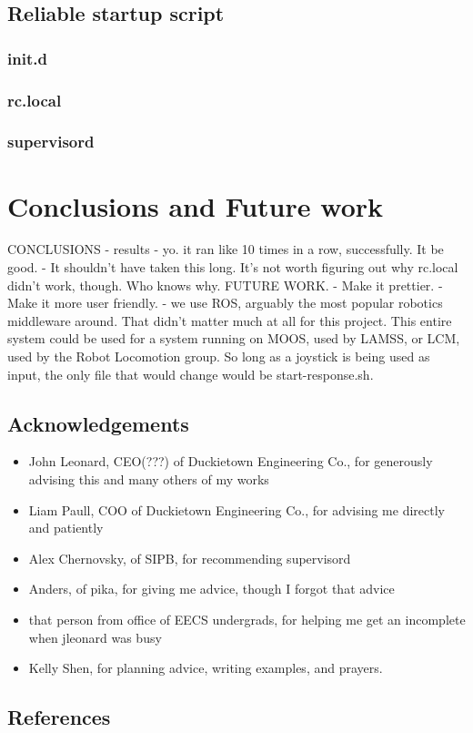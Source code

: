 \documentclass{article}
\begin{document}
\subsection{Reliable startup script} %
\subsubsection{init.d}
\subsubsection{rc.local}
\subsubsection{supervisord}
\section{Conclusions and Future work}
CONCLUSIONS
- results
- yo. it ran like 10 times in a row, successfully. It be good.
- It shouldn't have taken this long. It's not worth figuring out why
  rc.local didn't work, though. Who knows why.
FUTURE WORK. 
- Make it prettier. 
- Make it more user friendly. 
- we use ROS, arguably the most popular robotics middleware around. That didn't matter much at all for this project. This entire system could be used for a system running on MOOS, used by LAMSS, or LCM, used by the Robot Locomotion group. So long as a joystick is being used as input, the only file that would change would be start-response.sh.
\subsection{Acknowledgements}
\begin{itemize}
\item John Leonard, CEO(???) of Duckietown Engineering Co., for generously advising this and many others of my works
\item Liam Paull, COO of Duckietown Engineering Co., for advising me directly and patiently
\item Alex Chernovsky, of SIPB, for recommending supervisord
\item Anders, of pika, for giving me advice, though I forgot that advice
\item that person from office of EECS undergrads, for helping me get an incomplete when jleonard was busy
\item Kelly Shen, for planning advice, writing examples, and prayers. 
\end{itemize}

\subsection{References}
\end{document}
